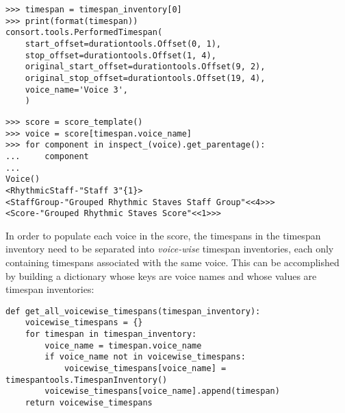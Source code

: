 \begin{abjadbookoutput}
\begin{singlespacing}
\vspace{-0.5\baselineskip}
\begin{verbatim}
>>> timespan = timespan_inventory[0]
>>> print(format(timespan))
consort.tools.PerformedTimespan(
    start_offset=durationtools.Offset(0, 1),
    stop_offset=durationtools.Offset(1, 4),
    original_start_offset=durationtools.Offset(9, 2),
    original_stop_offset=durationtools.Offset(19, 4),
    voice_name='Voice 3',
    )
\end{verbatim}
\begin{verbatim}
>>> score = score_template()
>>> voice = score[timespan.voice_name]
>>> for component in inspect_(voice).get_parentage():
...     component
...
Voice()
<RhythmicStaff-"Staff 3"{1}>
<StaffGroup-"Grouped Rhythmic Staves Staff Group"<<4>>>
<Score-"Grouped Rhythmic Staves Score"<<1>>>
\end{verbatim}
\end{singlespacing}
\end{abjadbookoutput}

\noindent In order to populate each voice in the score, the timespans in the
timespan inventory need to be separated into \emph{voice-wise} timespan
inventories, each only containing timespans associated with the same voice.
This can be accomplished by building a dictionary whose keys are voice names
and whose values are timespan inventories:

\begin{comment}
<abjadextract dissertation.py.time_tools:get_all_voicewise_timespans />[strip_prompt]
\end{comment}

\begin{abjadbookoutput}
\begin{singlespacing}
\vspace{-0.5\baselineskip}
\begin{verbatim}
def get_all_voicewise_timespans(timespan_inventory):
    voicewise_timespans = {}
    for timespan in timespan_inventory:
        voice_name = timespan.voice_name
        if voice_name not in voicewise_timespans:
            voicewise_timespans[voice_name] = timespantools.TimespanInventory()
        voicewise_timespans[voice_name].append(timespan)
    return voicewise_timespans
\end{verbatim}
\end{singlespacing}
\end{abjadbookoutput}

